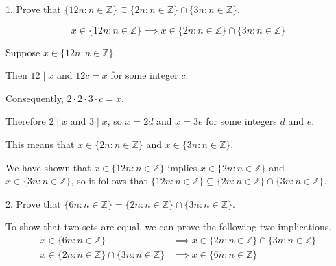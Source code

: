 \documentclass{idrisMemo}
\newcommand{\set}[1]{\{#1\}}
\begin{document}
\tableofcontents
\thispagestyle{styleTOC}
\pagebreak
\pagestyle{styleE}

\begin{prooflist}{1. Prove that $\{12 n: n \in \mathbb{Z}\} \subseteq\{2 n: n \in \mathbb{Z}\} \cap\{3 n: n \in \mathbb{Z}\}$.}
\item

\[
x \in \{12 n: n \in \mathbb{Z}\}
\implies
x \in \{2 n: n \in \mathbb{Z}\} \cap\{3 n: n \in \mathbb{Z}\}
\]
\item Suppose $x \in \{12 n: n \in \mathbb{Z}\}$.
\item Then $12 \mid x$ and $12c=x$
    for some integer $c$.
\item Consequently, $2\cdot2\cdot3\cdot c =x$.
\item Therefore $2\mid x$ and $3\mid x$, so $x =2d$ and $x=3e$ for some integers
    $d$ and $e$.
\item
This means that $x \in \{2 n: n \in \mathbb{Z}\}$ and $x \in \{3 n: n \in
    \mathbb{Z}\}$.
\item
We have shown that
$x \in \{12 n: n \in \mathbb{Z}\}$
implies
$x \in\{2n: n \in \mathbb{Z}\}$
and
$x \in\{3n: n \in \mathbb{Z}\}$,
so it follows that
$\set{12 n: n \in \mathbb{Z}} \subseteq\set{2 n: n \in \mathbb{Z}} \cap\{3 n: n \in
\mathbb{Z}\}$.
\end{prooflist}

\begin{prooflist}{2. Prove that $\set{6 n: n \in \mathbb{Z}}=\set{2 n: n \in
    \mathbb{Z}} \cap\set{3 n: n \in \mathbb{Z}}$.}
\item To show that two sets are equal, we can prove the following two
    implications.
\begin{align}
x \in \set{6 n: n \in \mathbb{Z}}
&\implies
x \in \set{2 n: n \in \mathbb{Z}} \cap\set{3 n: n \in \mathbb{Z}} \\
x \in \set{2 n: n \in \mathbb{Z}} \cap\set{3 n: n \in \mathbb{Z}}
&\implies
x \in \set{6 n: n \in \mathbb{Z}}
\end{align}

\end{prooflist}


\end{document}
